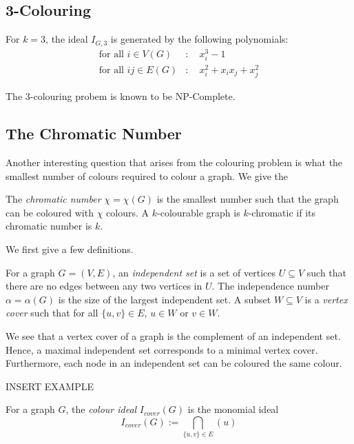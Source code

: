 \documentclass[../main.tex]{subfiles}
\begin{document}
    \subsection{3-Colouring}

    For $k=3$, the ideal $I_{G,3}$ is generated by the following polynomials:
    \begin{align*}
        \text{for all $i\in V(G)$}&:\quad x_i^3-1 \\
        \text{for all $ij\in E(G)$}&:\quad x_i^2+x_ix_j+x_j^2
    \end{align*}

    The 3-colouring probem is known to be NP-Complete.

    \subsection{The Chromatic Number}

    Another interesting question that arises from the colouring problem is what the smallest number of colours required to colour a graph. We give the 

    \begin{definition}
        The \emph{chromatic number} $\chi=\chi(G)$ is the smallest number such that the graph can be coloured with $\chi$ colours. A $k$-colourable graph is $k$-chromatic if its chromatic number is $k$.
    \end{definition}

    We first give a few definitions.

    \begin{definition}
        For a graph $G=(V,E)$, an \emph{independent set} is a set of vertices $U\subseteq V$ such that there are no edges between any two vertices in $U$. The independence number $\alpha=\alpha(G)$ is the size of the largest independent set. A subset $W\subseteq V$ is a \emph{vertex cover} such that for all $\{u,v\}\in E$, $u\in W$ or $v\in W$. 
    \end{definition}

    We see that a vertex cover of a graph is the complement of an independent set. Hence, a maximal independent set corresponds to a minimal vertex cover. Furthermore, each node in an independent set can be coloured the same colour.

    {\color{red} INSERT EXAMPLE}

    \begin{definition}
        For a graph $G$, the \emph{colour ideal} $I_{cover}(G)$ is the monomial ideal
        $$I_{cover}(G) := \bigcap_{\{u,v\}\in E}(u)$$
    \end{definition}
\end{document}
